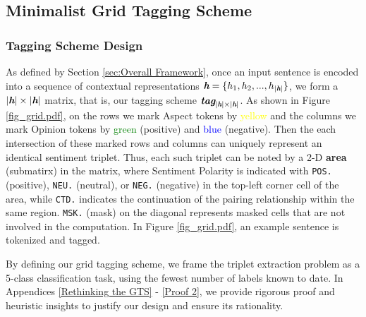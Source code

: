 \documentclass[11pt]{article}
\begin{document}
\subsection{Minimalist Grid Tagging Scheme}
\subsubsection{Tagging Scheme Design}


\noindent
As defined by Section \ref{sec:Overall Framework}, once an input sentence is encoded into a sequence of contextual representations \(\textit{\textbf{h}}=\{h_1, h_2, ..., h_{|\textit{\textbf{h}}|}\}\), we form a \(|\textit{\textbf{h}}| \times  |\textit{\textbf{h}}|\) matrix, that is, our tagging scheme \(\textit{\textbf{tag}}_{|\textit{\textbf{h}}| \times  |\textit{\textbf{h}}|} \). 
As shown in Figure \ref{fig_grid.pdf}, on the rows we mark Aspect tokens by \textcolor{yellow}{yellow} and the columns we mark Opinion tokens by \textcolor{green}{green} (positive) and \textcolor{blue}{blue} (negative). Then the each intersection of these marked rows and columns can uniquely represent an identical sentiment triplet. Thus, each such triplet can be noted by a 2-D \textbf{area} (submatirx) in the matrix, where Sentiment Polarity is indicated with \texttt{POS.} (positive), \texttt{NEU.} (neutral), or \texttt{NEG.} (negative) in the top-left corner cell of the area, while \texttt{CTD.} indicates the continuation of the pairing relationship within the same region. \texttt{MSK.} (mask) on the diagonal represents masked cells that are not involved in the computation. In Figure \ref{fig_grid.pdf}, an example sentence is tokenized and tagged. 

By defining our grid tagging scheme, we frame the triplet extraction problem as a 5-class classification task, using the fewest number of labels known to date. In Appendices \ref{Rethinking the GTS} - \ref{Proof 2}, we provide rigorous proof and heuristic insights to justify our design and ensure its rationality.

\end{document}
